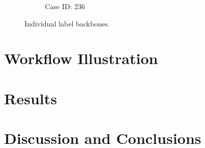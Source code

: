 \documentclass[12pt]{article}
\begin{document}
\begin{figure}[ht!]
\begin{subfigure}[b]{0.49\textwidth}
            \caption{Case ID: 236}
            \label{fig:ind-ex-cbb2}
    \end{subfigure}
    \caption{Individual label backbones.}
    \label{fig:ind-ex-cbb}
\end{figure}

\section*{Workflow Illustration}

\section*{Results}

\section*{Discussion and Conclusions}

\newpage


\end{document}
